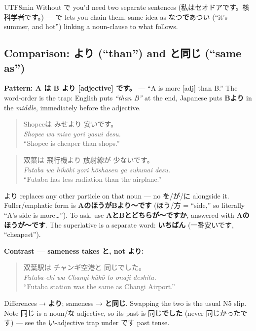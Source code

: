 \documentclass[11pt]{article}
\begin{document}
\begin{CJK}{UTF8}{min}
Without で you'd need two separate sentences (私はセオドアです。核科学者です。)
--- で lets you chain them, same idea as なつ\textbf{で}あつい (``it's summer,
and hot'') linking a noun-clause to what follows.

\subsection{Comparison: \texorpdfstring{より}{yori} (``than'') and \texorpdfstring{と同じ}{to onaji} (``same as'')}
\textbf{Pattern: A は B より [adjective] です。} --- ``A is more [adj] than B.''
The word-order is the trap: English puts \emph{``than B''} at the end, Japanese
puts \textbf{Bより} in the \emph{middle}, immediately before the adjective.

\begin{quote}
Shopeeは みせより 安いです。\\
\emph{Shopee wa mise yori yasui desu.}\\
``Shopee is cheaper than shops.''
\end{quote}

\begin{quote}
双葉は 飛行機より 放射線が 少ないです。\\
\emph{Futaba wa hikōki yori hōshasen ga sukunai desu.}\\
``Futaba has less radiation than the airplane.''
\end{quote}

より replaces any other particle on that noun --- no を/が/に alongside it.
Fuller/emphatic form is \textbf{AのほうがBより〜です} (ほう/方 = ``side,'' so
literally ``A's side is more\ldots''). To ask, use
\textbf{AとBとどちらが〜ですか}, answered with \textbf{Aのほうが〜です}.
The superlative is a separate word: \textbf{いちばん} (一番安いです, ``cheapest'').

\textbf{Contrast --- sameness takes と, not より:}

\begin{quote}
双葉駅は チャンギ空港と 同じでした。\\
\emph{Futaba-eki wa Changi-kūkō to onaji deshita.}\\
``Futaba station was the same as Changi Airport.''
\end{quote}

Differences → \textbf{より}; sameness → \textbf{と同じ}. Swapping the two is the
usual N5 slip. Note 同じ is a noun/な-adjective, so its past is 同じ\textbf{でした}
(never 同じかったです) --- see the い-adjective trap under です past tense.


\end{CJK}
\end{document}
